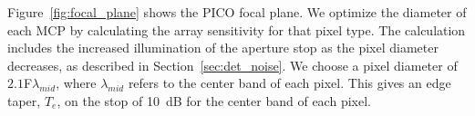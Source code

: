 \documentclass[]{spie}  %
\newcommand{\comb}[1]{\textcolor{blue}{#1}}
\begin{document}
Figure~\ref{fig:focal_plane} shows the PICO focal plane.  
We optimize the diameter of each MCP by calculating the array sensitivity for that pixel type. The calculation includes the 
increased illumination of the aperture stop as the pixel diameter decreases, as described in Section~\ref{sec:det_noise}.
We choose a pixel diameter of $2.1$F$\lambda_{mid}$, where $\lambda_{mid}$ refers to the center 
band of each pixel. This gives an edge taper, $T_e$, on the stop of 10~dB for the center band of each pixel. 



\end{document}
